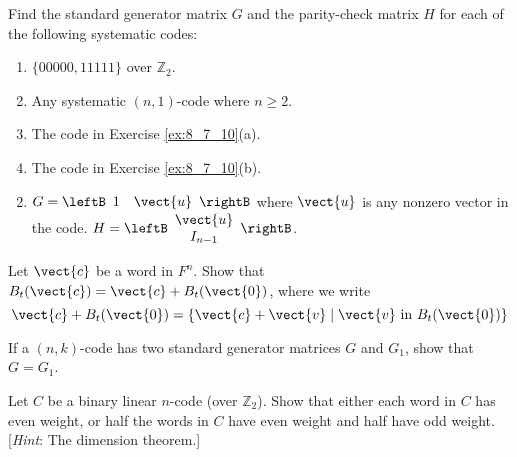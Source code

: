 \begin{multicols}{2}
\begin{ex}
\begin{sol}
\begin{enumerate}[label={\alph*.}]
\end{enumerate}
\end{sol}
\end{ex}

\begin{ex}
Find the standard generator matrix $G$ and the parity-check matrix $H$ for each of the following systematic codes:

\begin{enumerate}[label={\alph*.}]
\item $\{00000, 11111\}$ over $\mathbb{Z}_2$.

\item Any systematic $(n, 1)$-code where $n \geq 2$.

\item The code in Exercise \ref{ex:8_7_10}(a).

\item The code in Exercise \ref{ex:8_7_10}(b).

\end{enumerate}
\begin{sol}
\begin{enumerate}[label={\alph*.}]
\setcounter{enumi}{1}
\item  $G = 
\leftB \begin{array}{cc}
1 & \vect{u}
\end{array} \rightB$ where $\vect{u}$ is any nonzero vector in the code. $H = \leftB \begin{array}{c}
\vect{u} \\
I_{n-1}
\end{array}\rightB$.

\end{enumerate}
\end{sol}
\end{ex}

\begin{ex}
Let $\vect{c}$ be a word in $F^{n}$. Show that $B_{t}(\vect{c}) = \vect{c} + B_{t}(\vect{0})$, where we write 
\begin{equation*}
\vect{c} + B_{t}(\vect{0}) = \{\vect{c} + \vect{v} \mid \vect{v} \mbox{ in } B_{t}(\vect{0})\}
\end{equation*}
\end{ex}

\begin{ex}
If a $(n, k)$-code has two standard generator matrices $G$ and $G_{1}$, show that $G = G_{1}$.
\end{ex}

\begin{ex}
Let $C$ be a binary linear $n$-code (over $\mathbb{Z}_2$). Show that either each word in $C$ has even weight, or half the words in $C$ have even weight and half have odd weight. [\textit{Hint}: The dimension theorem.]
\end{ex}
\end{multicols}

